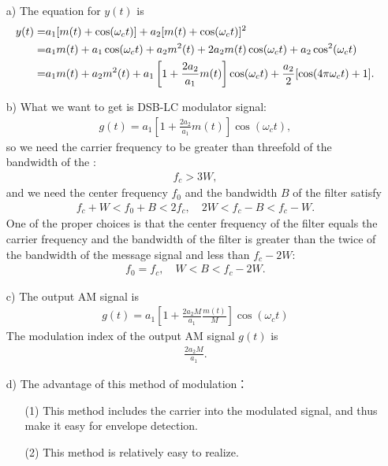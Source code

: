 \documentclass{assignment}
\begin{document}
\begin{sol}
    \begin{itemize}
        \item[a)] The equation for $y(t)$ is
        \begin{align}
            \notag y(t)=&a_1[m(t)+\cos(\omega_ct)]+a_2[m(t)+\cos(\omega_ct)]^2\\
            \notag=&a_1m(t)+a_1\cos(\omega_ct)+a_2m^2(t)+2a_2m(t)\cos(\omega_ct)+a_2\cos^2(\omega_ct)\\
            =&a_1m(t)+a_2m^2(t)+a_1\left[1+\frac{2a_2}{a_1}m(t)\right]\cos(\omega_ct)+\frac{a_2}{2}[\cos(4\pi\omega_ct)+1].
        \end{align}
        \item[b)] What we want to get is DSB-LC modulator signal:
        \begin{align}
            g(t)=a_1\left[1+\frac{2a_2}{a_1}m(t)\right]\cos(\omega_ct),
        \end{align}
        so we need the carrier frequency to be greater than threefold of the bandwidth of the :
        \begin{align}
            f_c>3W,
        \end{align}
        and we need the center frequency $f_0$ and the bandwidth $B$ of the filter satisfy
        \begin{align}
            f_c+W<f_0+B<2f_c,\quad 2W<f_c-B<f_c-W.
        \end{align}
        One of the proper choices is that the center frequency of the filter equals the carrier frequency and the bandwidth of the filter is greater than the twice of the bandwidth of the message signal and less than $f_c-2W$:
        \begin{align}
            f_0=f_c,\quad W<B<f_c-2W.
        \end{align}
        \item[c)] The output AM signal is
        \begin{align}
            g(t)=a_1\left[1+\frac{2a_2M}{a_1}\frac{m(t)}{M}\right]\cos(\omega_ct)
        \end{align}
        The modulation index of the output AM signal $g(t)$ is
        \begin{align}
            \frac{2a_2M}{a_1}.
        \end{align}
        \item[d)] The advantage of this method of modulation：
        \begin{itemize}
            \item[(1)] This method includes the carrier into the modulated signal, and thus make it easy for envelope detection.
            \item[(2)] This method is relatively easy to realize.
        \end{itemize}
    \end{itemize}
\end{sol}
\end{document}
